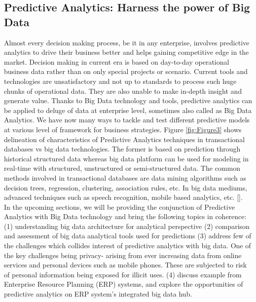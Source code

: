\documentclass[runningheads]{llncs}
\begin{document}
\subsection{Predictive Analytics: Harness the power of Big Data}Almost every decision making process, be it in any enterprise, involves predictive analytics to drive their business better and helps gaining competitive edge in the market. Decision making in current era is based on day-to-day operational business data rather than on only special projects or scenario. Current tools and technologies are unsatisfactory and not up to standards to process such huge chunks of operational data. They are also unable to make in-depth insight and generate value. \newline
Thanks to Big Data technology and tools, predictive analytics can be applied to deluge of data at enterprise level, sometimes also called as Big Data Analytics. We have now many ways to tackle and test different predictive models at various level of framework for business strategies. Figure \ref{fig:Figure3} shows delineation of characteristics of Predictive Analytics techniques in transactional databases vs big data technologies. The former is based on prediction through historical structured data whereas big data platform can be used for modeling in real-time with structured, unstructured or semi-structured data. The common methods involved in transactional databases are data mining algorithms such as decision trees, regression, clustering, association rules, etc. In big data mediums, advanced techniques such as speech recognition, mobile based analytics, etc. [\cite{7}].\\
In the upcoming sections, we will be providing the conjunction of Predictive Analytics with Big Data technology and bring the following topics in coherence:\newline
(1) understanding big data architecture for analytical perspective \newline
(2) comparison and assessment of big data analytical tools used for predictions \newline
(3) address few of the challenges which collides interest of predictive analytics with big data. One of the key challenges being privacy- arising from ever increasing data from online services and personal devices such as mobile phones. These are subjected to risk of personal information being exposed for illicit uses. \newline
(4) discuss example from Enterprise Resource Planning (ERP) systems, and explore the opportunities of predictive analytics on ERP system's integrated big data hub. \newline
\end{document}
